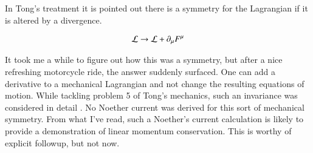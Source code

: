 \documentclass{article}
\begin{document}
In Tong's treatment it is pointed out there is a symmetry for the Lagrangian
if it is altered by a divergence.

\begin{align*}
\mathcal{L} \rightarrow \mathcal{L} + \partial_\mu F^\mu
\end{align*}

It took me a while to figure out how this was a symmetry, but after a
nice refreshing motorcycle ride, the answer suddenly surfaced.  One
can add a derivative to a mechanical Lagrangian and not change
the resulting equations of motion.  While tackling problem 5 of 
Tong's mechanics, such an invariance was considered in
detail
.  No Noether current was 
derived for this sort of mechanical symmetry.  From
what I've read, such a Noether's current calculation is 
likely to provide a demonstration of linear momentum conservation.  This
is worthy of explicit followup, but not now.





\end{document}
